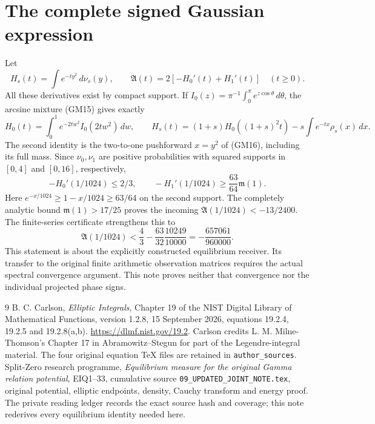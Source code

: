 \documentclass[11pt]{article}
\newcommand{\dd}{\,d}\newcommand{\R}{\mathbb R}
\begin{document}
\section{The complete signed Gaussian expression}
Let
\begin{equation}\tag{GM23}
 H_s(t)=\int e^{-ty^2}\dd\nu_s(y),\qquad
 \mathfrak A(t)=2[-H_0'(t)+H_1'(t)]\quad(t\ge0).
\end{equation}
All these derivatives exist by compact support. If
$I_0(z)=\pi^{-1}\int_0^\pi e^{z\cos\theta}\dd\theta$, the arcsine
mixture (GM15) gives exactly
\begin{equation}\tag{GM24}
 H_0(t)=\int_0^1e^{-2tw^2}I_0(2tw^2)\dd w,\qquad
 H_s(t)=(1+s)H_0((1+s)^2t)-s\int e^{-tx}\rho_s(x)\dd x.
\end{equation}
The second identity is the two-to-one pushforward $x=y^2$ of (GM16),
including its full mass. Since $\nu_0,\nu_1$ are positive probabilities
with squared supports in $[0,4]$ and $[0,16]$, respectively,
\[
 -H_0'(1/1024)\le2/3,\qquad
 -H_1'(1/1024)\ge\frac{63}{64}\mathfrak m(1).
\]
Here $e^{-x/1024}\ge1-x/1024\ge63/64$ on the second support.
The completely analytic bound $\mathfrak m(1)>17/25$ proves the incoming
$\mathfrak A(1/1024)<-13/2400$. The finite-series certificate strengthens
this to
\begin{equation}\tag{GM25}
 \boxed{\mathfrak A(1/1024)
 <\frac43-\frac{63}{32}\frac{10249}{10000}
 =-\frac{657061}{960000}.}
\end{equation}
This statement is about the explicitly constructed equilibrium receiver.
Its transfer to the original finite arithmetic observation matrices
requires the actual spectral convergence argument. This note proves
neither that convergence nor the individual projected phase signs.

\begin{thebibliography}{9}
 B. C. Carlson, \emph{Elliptic Integrals}, Chapter 19 of
the NIST Digital Library of Mathematical Functions, version 1.2.8,
15 September 2026, equations 19.2.4, 19.2.5 and 19.2.8(a,b).
\url{https://dlmf.nist.gov/19.2}. Carlson credits L. M. Milne-Thomson's
Chapter 17 in Abramowitz--Stegun for part of the Legendre-integral material.
The four original equation TeX files are retained in \texttt{author\_sources}.
 Split-Zero research programme, \emph{Equilibrium measure for
the original Gamma relation potential}, EIQ1--33, cumulative source
\texttt{09\_UPDATED\_JOINT\_NOTE.tex}, original potential, elliptic endpoints,
density, Cauchy transform and energy proof. The private reading ledger
records the exact source hash and coverage; this note rederives every
equilibrium identity needed here.
\end{thebibliography}
\end{document}
